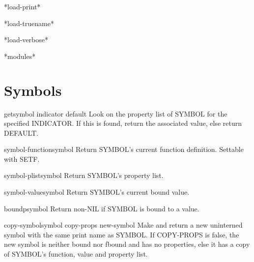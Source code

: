 \documentclass[10pt,english]{book}
\begin{document}
\begin{variable}{*load-print*}{}
  
\end{variable}

\begin{variable}{*load-truename*}{}
  
\end{variable}

\begin{variable}{*load-verbose*}{}
  
\end{variable}

\begin{variable}{*modules*}{}
  
\end{variable}

\section{Symbols}

\begin{accessor}{get}{symbol indicator \op default}
  Look on the property list of SYMBOL for the specified INDICATOR. If this
  is found, return the associated value, else return DEFAULT.
\end{accessor}

\begin{accessor}{symbol-function}{symbol}
  Return SYMBOL's current function definition. Settable with SETF.
\end{accessor}

\begin{accessor}{symbol-plist}{symbol}
  Return SYMBOL's property list.
\end{accessor}

\begin{accessor}{symbol-value}{symbol}
  Return SYMBOL's current bound value.
\end{accessor}

\begin{function}{boundp}{symbol}
  Return non-NIL if SYMBOL is bound to a value.
\end{function}

\begin{function}{copy-symbol}{symbol \op copy-props \aux new-symbol}
  Make and return a new uninterned symbol with the same print name
  as SYMBOL. If COPY-PROPS is false, the new symbol is neither bound
  nor fbound and has no properties, else it has a copy of SYMBOL's
  function, value and property list.
\end{function}
\end{document}
